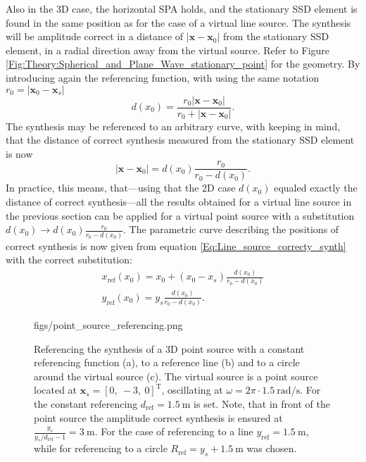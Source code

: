 \documentclass[12pt,a4paper]{article}
\newcommand{\yref}{y_{\mathrm{ref}}}
\newcommand{\dref}{d_{\mathrm{ref}}}
\newcommand{\vx}{\mathbf{x}}
\newcommand{\vxo}{\mathbf{x}_0}
\begin{document}
\vspace{3mm}
Also in the 3D case, the horizontal SPA holds, and the stationary SSD element is found in the same position as for the case of a virtual line source. The synthesis will be amplitude correct in a distance of $| \vx - \vxo| $ from the stationary SSD element, in a radial direction away from the virtual source. Refer to Figure \ref{Fig:Theory:Spherical_and_Plane_Wave_stationary_point} for the geometry. By introducing again the referencing function, with using the same notation $r_0 = | \vxo - \mathbf{x}_s |$ 
\begin{equation}
d(x_0) = \frac{ r_0 | \vx - \vxo|  }{ r_0 + | \vx - \vxo| }.
\end{equation}
The synthesis may be referenced to an arbitrary curve, with keeping in mind, that the distance of correct synthesis measured from the stationary SSD element is now
\begin{equation}
|\vx - \vxo| = d(x_0)\frac{r_0}{r_0 - d(x_0)}.
\end{equation}
In practice, this means, that---using that the 2D case $d(x_0)$ equaled exactly the distance of correct synthesis---all the results obtained for a virtual line source in the previous section can be applied for a virtual point source with a substitution $d(x_0) \rightarrow d(x_0)\frac{r_0}{r_0 - d(x_0)}$. The parametric curve describing the positions of correct synthesis is now given from equation \eqref{Eq:Line_source_correcty_synth} with the correct substitution:
\begin{eqnarray}
x_{\mathrm{ref}}(x_0) = x_0 + (x_0-x_s) \frac{d(x_0)}{r_0 - d(x_0)} \\
y_{\mathrm{ref}}(x_0) = y_s \frac{d(x_0)}{r_0 - d(x_0)}.
\label{Eq:3D_curve}
\end{eqnarray}

\begin{figure}
	\centering
	\begin{overpic}[width = 1\columnwidth ]{figs/point_source_referencing.png}
	\scriptsize
	\end{overpic}
\caption{Referencing the synthesis of a 3D point source with a constant referencing function (a), to a reference line (b) and to a circle around the virtual source (c). The virtual source is a point source located at $\mathbf{x}_s = [0,\ -3,\ 0]^{\mathrm{T}}$, oscillating at $\omega = 2\pi \cdot 1.5 ~\mathrm{rad/s}$. For the constant referencing $\dref = 1.5~\mathrm{m}$ is set. Note, that in front of the point source the amplitude correct synthesis is ensured at $\frac{y_s}{y_s/\dref - 1 } = 3~\mathrm{m}$. For the case of referencing to a line $\yref = 1.5~\mathrm{m}$, while for referencing to a circle $R_{\mathrm{ref}} = y_s + 1.5~\mathrm{m}$ was chosen.}
	\label{Fig:Theory:point_source_referencing}
\end{figure}
\end{document}
